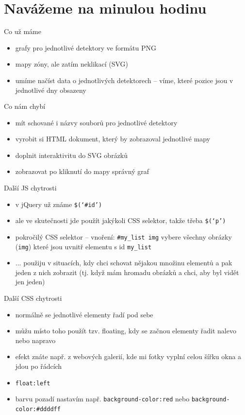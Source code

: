 \documentclass{beamer}
\begin{document}
\section{Navážeme na minulou hodinu}

\begin{frame}{Co už máme}
  \begin{itemize}
    \item grafy pro jednotlivé detektory ve formátu PNG
    \item mapy zóny, ale zatím neklikací (SVG)
    \item umíme načíst data o jednotlivých detektorech -- víme, které pozice jsou v jednotlivé dny obsazeny
  \end{itemize}
\end{frame}

\begin{frame}{Co nám chybí}
  \begin{itemize}
    \item mít schované i názvy souborů pro jednotlivé detektory
    \item vyrobit si HTML dokument, který by zobrazoval jednotlivé mapy
    \item doplnit interaktivitu do SVG obrázků
    \item zobrazovat po kliknutí do mapy správný graf
  \end{itemize}
\end{frame}

\begin{frame}{Další JS chytrosti}
  \begin{itemize}
    \item v jQuery už známe \texttt{\$(`\#id')}
    \item ale ve skutečnosti jde použít jakýkoli CSS selektor, takže třeba \texttt{\$(`p')}
    \item pokročilý CSS selektor -- vnoření: \texttt{\#my\_list img} vybere všechny obrázky (\texttt{img}) které jsou uvnitř elementu s id \texttt{my\_list}
    \item ... použiju v situacích, kdy chci schovat nějakou množinu elementů a pak jeden z nich zobrazit (tj. když mám hromadu obrázků a chci, aby byl vidět jen jeden)
  \end{itemize}
\end{frame}

\begin{frame}{Další CSS chytrosti}
  \begin{itemize}
    \item normálně se jednotlivé elementy řadí pod sebe
    \item můžu místo toho použít tzv. floating, kdy se začnou elementy řadit nalevo nebo napravo
    \item efekt znáte např. z webových galerií, kde mi fotky vyplní celou šířku okna a jdou po řádcích
    \item \texttt{float:left}
    \item barvu pozadí nastavím např. \texttt{background-color:red} nebo \texttt{background-color:\#ddddff}
  \end{itemize}
\end{frame}
\end{document}
